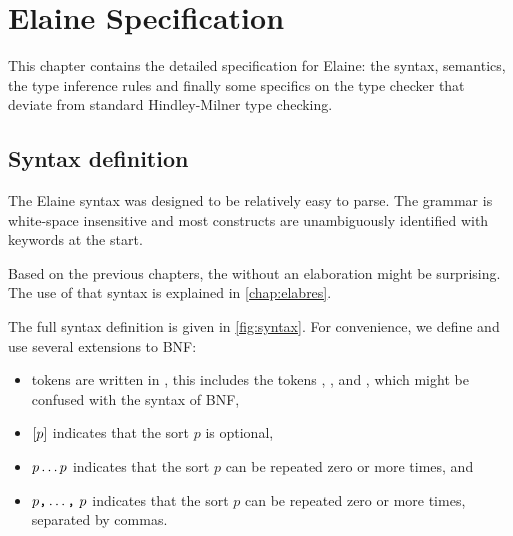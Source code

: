 \chapter{Elaine Specification}\label{chap:spec}


This chapter contains the detailed specification for Elaine: the syntax, semantics, the type inference rules and finally some specifics on the type checker that deviate from standard Hindley-Milner type checking.

\section{Syntax definition}\label{sec:syntax}

The Elaine syntax was designed to be relatively easy to parse. The grammar is white-space insensitive and most constructs are unambiguously identified with keywords at the start.

Based on the previous chapters, the  without an elaboration might be surprising. The use of that syntax is explained in \cref{chap:elabres}.

The full syntax definition is given in \cref{fig:syntax}. For convenience, we define and use several extensions to BNF:
\begin{itemize}
    \item tokens are written in , this includes the tokens \tok{[]}, \tok{<>}, \tok{|} and \tok{!}, which might be confused with the syntax of BNF,
    \item $[p]$ indicates that the sort $p$ is optional,
    \item $p \dots p$ indicates that the sort $p$ can be repeated zero or more times, and
    \item $p\text{\texttt{,}} \dots \text{\texttt{,}}\ p$ indicates that the sort $p$ can be repeated zero or more times, separated by commas.
\end{itemize}

